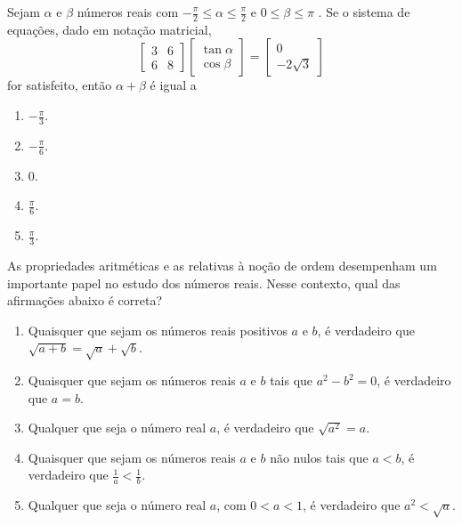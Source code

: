 \documentclass[oneside,a4paper]{amsart}
\begin{document}
\begin{questao} 
  Sejam $\alpha$ e $\beta$ números reais com
  $-\frac{\pi}{2}\leq\alpha\leq\frac{\pi}{2}$ e $0\leq\beta\leq\pi$ . Se o
  sistema de equações, dado em notação matricial, \[
  \begin{bmatrix}
    3&6\\
    6&8
  \end{bmatrix}
  \begin{bmatrix}
    \tan\alpha\\\cos\beta
  \end{bmatrix} =
  \begin{bmatrix}
    0\\-2\sqrt{3}
  \end{bmatrix}\] for satisfeito, então $\alpha+\beta$ é igual a

  \begin{enumerate}[\bf a.]
    \item $-\frac{\pi}{3}$.
    \item $-\frac{\pi}{6}$. %
    \item $0$.
    \item $\frac{\pi}{6}$.
    \item $\frac{\pi}{3}$.
  \end{enumerate}
\end{questao}

\begin{questao}
  As propriedades aritméticas e as relativas à noção de ordem
  desempenham um importante papel no estudo dos números reais. Nesse
  contexto, qual das afirmações abaixo é correta?
  \begin{enumerate}[\bf a.]
    \item Quaisquer que sejam os números reais positivos $a$ e $b$, é
    verdadeiro que $\sqrt{a+b}=\sqrt{a}+\sqrt{b}$.
    \item Quaisquer que sejam os números reais $a$ e $b$ tais que
    $a^2-b^2=0$, é verdadeiro que $a=b$.
    \item Qualquer que seja o número real $a$, é verdadeiro que
    $\sqrt{a^2}=a$.
    \item Quaisquer que sejam os números reais $a$ e $b$ não nulos tais
    que $a<b$, é verdadeiro que $\frac{1}{a}<\frac{1}{b}$.
    \item Qualquer que seja o número real $a$, com $0<a<1$, é verdadeiro
    que $a^2<\sqrt{a}$. %
  \end{enumerate}
\end{questao}
\end{document}

